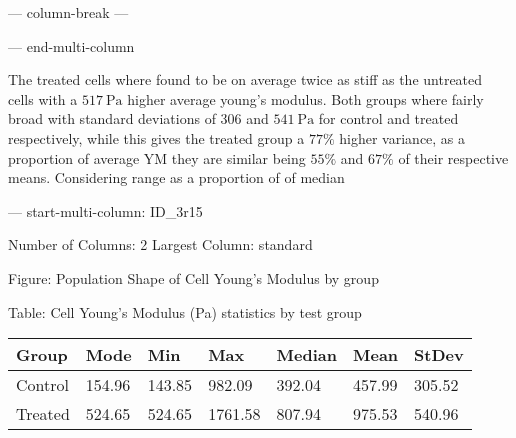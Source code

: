 \documentclass[
  paper=a4,
  ,captions=tableheading
]{scrartcl}
\makeatletter
\newenvironment{Shaded}{}{}
\newcommand{\NormalTok}[1]{#1}
\newcommand*\pandocbounded[1]{%
  \sbox\pandoc@box{#1}%
  \Gscale@div\@tempa{\textheight}{\dimexpr\ht\pandoc@box+\dp\pandoc@box\relax}%
  \Gscale@div\@tempb{\linewidth}{\wd\pandoc@box}%
  \ifdim\@tempb\p@<\@tempa\p@\let\@tempa\@tempb\fi%
  \ifdim\@tempa\p@<\p@\scalebox{\@tempa}{\usebox\pandoc@box}%
  \else\usebox{\pandoc@box}%
  \fi%
}
\makeatother
\begin{document}
\pandocbounded{}

--- column-break ---

\pandocbounded{}

--- end-multi-column

The treated cells where found to be on average twice as stiff as the
untreated cells with a \(517 \ \text{Pa}\) higher average young's
modulus. Both groups where fairly broad with standard deviations of
\(306\) and \(541 \ \text{Pa}\) for control and treated respectively,
while this gives the treated group a \(77\%\) higher variance, as a
proportion of average YM they are similar being \(55\%\) and \(67\%\) of
their respective means. Considering range as a proportion of of median

--- start-multi-column: ID\_3r15

\begin{Shaded}
\begin{Highlighting}[]
\NormalTok{Number of Columns: 2}
\NormalTok{Largest Column: standard}
\end{Highlighting}
\end{Shaded}

Figure: Population Shape of Cell Young's Modulus by group

\begin{figure}
\centering
\pandocbounded{}
\caption{}
\end{figure}

Table: Cell Young's Modulus (Pa) statistics by test group

\begin{longtable}[]{@{}lllllll@{}}
\toprule\noalign{}
Group & Mode & Min & Max & Median & Mean & StDev \\
\midrule\noalign{}
\endhead
\bottomrule\noalign{}
\endlastfoot
Control & 154.96 & 143.85 & 982.09 & 392.04 & 457.99 & 305.52 \\
Treated & 524.65 & 524.65 & 1761.58 & 807.94 & 975.53 & 540.96 \\
\end{longtable}
\end{document}
